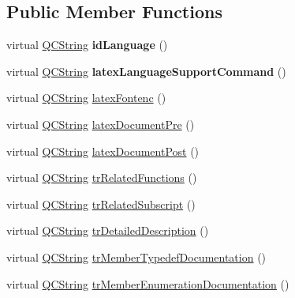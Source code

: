 \subsection*{Public Member Functions}
\begin{DoxyCompactItemize}
\item 
\mbox{\label{class_translator_japanese_a0b68286bc9bd3f03a24220d1c2f900f7}} 
virtual \mbox{\hyperlink{class_q_c_string}{Q\+C\+String}} {\bfseries id\+Language} ()
\item 
\mbox{\label{class_translator_japanese_aadd11e46585e4d05bd1d92733f3d86b8}} 
virtual \mbox{\hyperlink{class_q_c_string}{Q\+C\+String}} {\bfseries latex\+Language\+Support\+Command} ()
\item 
virtual \mbox{\hyperlink{class_q_c_string}{Q\+C\+String}} \mbox{\hyperlink{class_translator_japanese_aff9e398a5bba5fa1e345ffba08964466}{latex\+Fontenc}} ()
\item 
virtual \mbox{\hyperlink{class_q_c_string}{Q\+C\+String}} \mbox{\hyperlink{class_translator_japanese_abcfec41fcfaf972e191aa2bf14057b2f}{latex\+Document\+Pre}} ()
\item 
virtual \mbox{\hyperlink{class_q_c_string}{Q\+C\+String}} \mbox{\hyperlink{class_translator_japanese_a42f015953ee9043a126064c16fccae46}{latex\+Document\+Post}} ()
\item 
virtual \mbox{\hyperlink{class_q_c_string}{Q\+C\+String}} \mbox{\hyperlink{class_translator_japanese_a79ec63e57a7f3ee93379aeb0c0a488ba}{tr\+Related\+Functions}} ()
\item 
virtual \mbox{\hyperlink{class_q_c_string}{Q\+C\+String}} \mbox{\hyperlink{class_translator_japanese_ab68faec70a1979ff9b2b8d754b8cbf30}{tr\+Related\+Subscript}} ()
\item 
virtual \mbox{\hyperlink{class_q_c_string}{Q\+C\+String}} \mbox{\hyperlink{class_translator_japanese_ad16cb36fd418dbcc99b6d87fa1950050}{tr\+Detailed\+Description}} ()
\item 
virtual \mbox{\hyperlink{class_q_c_string}{Q\+C\+String}} \mbox{\hyperlink{class_translator_japanese_aafd4d81360e19814aa5e8e99a2738444}{tr\+Member\+Typedef\+Documentation}} ()
\item 
virtual \mbox{\hyperlink{class_q_c_string}{Q\+C\+String}} \mbox{\hyperlink{class_translator_japanese_ac678de2e9035626add9a498001597c94}{tr\+Member\+Enumeration\+Documentation}} ()
\item 

\end{DoxyCompactItemize}
